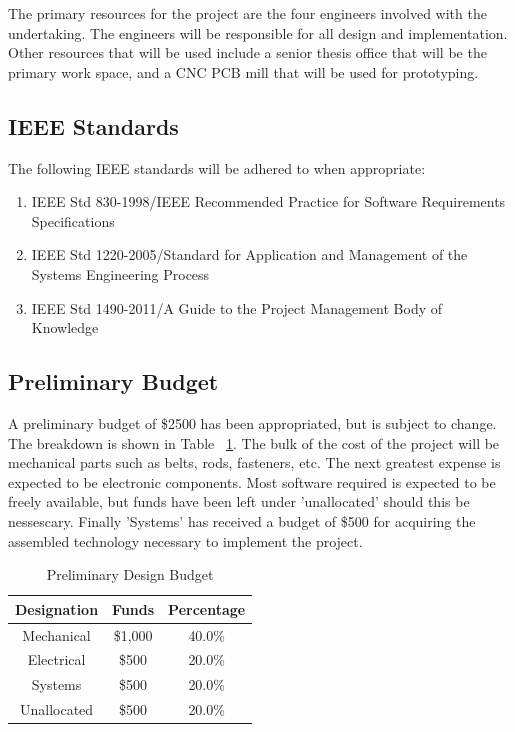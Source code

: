 \documentclass[11pt]{report}
\begin{document}
The primary resources for the project are the four engineers involved with the undertaking.
The engineers will be responsible for all design and implementation.
Other resources that will be used include a senior thesis office that will be the primary work space, and a CNC PCB mill that will be used for prototyping.

\subsection{IEEE Standards}
The following IEEE standards will be adhered to when appropriate:
\begin{enumerate} \parskip2pt
	\item IEEE Std 830-1998/IEEE Recommended Practice for Software Requirements Specifications
	\item IEEE Std 1220-2005/Standard for Application and Management of the Systems Engineering Process
	\item IEEE Std 1490-2011/A Guide to the Project Management Body of Knowledge
\end{enumerate}

\subsection{Preliminary Budget}
A preliminary budget of \$2500 has been appropriated, but is subject to change.
The breakdown is shown in Table ~\ref{table:budget}.
The bulk of the cost of the project will be mechanical parts such as belts, rods, fasteners, etc.
The next greatest expense is expected to be electronic components.
Most software required is expected to be freely available, but funds have been left under 'unallocated' should this be nessescary.
Finally 'Systems' has received a budget of \$500 for acquiring the assembled technology necessary to implement the project. 

\begin{table}[ht] 
	\centering 
	\begin{tabular}{c c c} 
		Designation	& Funds 		& Percentage\\
		\hline
		Mechanical	& \$1,000 	& 40.0\% \\ 
		Electrical	& \$500 		& 20.0\% \\ 
		Systems		& \$500 		& 20.0\% \\ 
		Unallocated	& \$500 		& 20.0\% \\
	\end{tabular} 
	\caption{Preliminary Design Budget}
	\label{table:budget}
\end{table}
\end{document}
